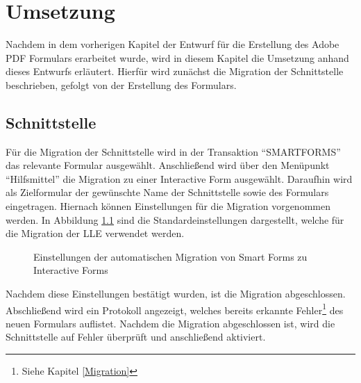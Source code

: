 \chapter{Umsetzung}


Nachdem in dem vorherigen Kapitel der Entwurf für die Erstellung des Adobe \ac{PDF} Formulars erarbeitet wurde, wird in diesem Kapitel die Umsetzung anhand dieses Entwurfs erläutert.
Hierfür wird zunächst die Migration der Schnittstelle beschrieben, gefolgt von der Erstellung des Formulars. 
 

\section{Schnittstelle}

Für die Migration der Schnittstelle wird in der Transaktion "`SMARTFORMS"' das relevante Formular ausgewählt. Anschließend wird über den Menüpunkt "`Hilfsmittel"' die Migration zu einer Interactive Form ausgewählt. Daraufhin wird als Zielformular der gewünschte Name der Schnittstelle sowie des Formulars eingetragen. Hiernach können Einstellungen für die Migration vorgenommen werden. In Abbildung \ref{mig-einst}
 sind die Standardeinstellungen dargestellt, welche für die Migration der \ac{LLE} verwendet werden.
 
 \begin{figure}[ht]
 	\centering
 	\caption{Einstellungen der automatischen Migration von Smart Forms zu Interactive Forms}
 	\label{mig-einst}
 \end{figure}

Nachdem diese Einstellungen bestätigt wurden, ist die Migration abgeschlossen. Abschließend wird ein Protokoll angezeigt, welches bereits erkannte Fehler\footnote{Siehe Kapitel \ref{Migration}} des neuen Formulars auflistet. Nachdem die Migration abgeschlossen ist, wird die Schnittstelle auf Fehler überprüft und anschließend aktiviert. 

